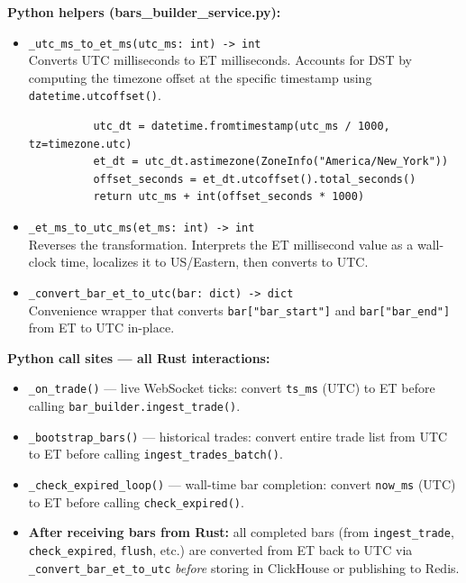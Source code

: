\documentclass[a4paper, 11pt]{article}
\begin{document}
\textbf{Python helpers (bars\_builder\_service.py):}
\begin{itemize}[nosep]
    \item \texttt{\_utc\_ms\_to\_et\_ms(utc\_ms: int) -> int} \\
          Converts UTC milliseconds to ET milliseconds.  Accounts for DST by
          computing the timezone offset at the specific timestamp using
          \texttt{datetime.utcoffset()}.
          \begin{verbatim}
          utc_dt = datetime.fromtimestamp(utc_ms / 1000, tz=timezone.utc)
          et_dt = utc_dt.astimezone(ZoneInfo("America/New_York"))
          offset_seconds = et_dt.utcoffset().total_seconds()
          return utc_ms + int(offset_seconds * 1000)
          \end{verbatim}

    \item \texttt{\_et\_ms\_to\_utc\_ms(et\_ms: int) -> int} \\
          Reverses the transformation.  Interprets the ET millisecond value as a
          wall-clock time, localizes it to US/Eastern, then converts to UTC.

    \item \texttt{\_convert\_bar\_et\_to\_utc(bar: dict) -> dict} \\
          Convenience wrapper that converts \texttt{bar["bar\_start"]} and
          \texttt{bar["bar\_end"]} from ET to UTC in-place.
\end{itemize}

\textbf{Python call sites --- all Rust interactions:}
\begin{itemize}[nosep]
    \item \texttt{\_on\_trade()} --- live WebSocket ticks: convert \texttt{ts\_ms}
          (UTC) to ET before calling \texttt{bar\_builder.ingest\_trade()}.
    \item \texttt{\_bootstrap\_bars()} --- historical trades: convert entire trade
          list from UTC to ET before calling \texttt{ingest\_trades\_batch()}.
    \item \texttt{\_check\_expired\_loop()} --- wall-time bar completion: convert
          \texttt{now\_ms} (UTC) to ET before calling \texttt{check\_expired()}.
    \item \textbf{After receiving bars from Rust:} all completed bars (from
          \texttt{ingest\_trade}, \texttt{check\_expired}, \texttt{flush}, etc.)
          are converted from ET back to UTC via \texttt{\_convert\_bar\_et\_to\_utc}
          \emph{before} storing in ClickHouse or publishing to Redis.
\end{itemize}
\end{document}
